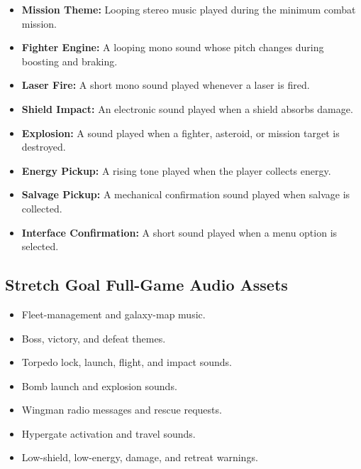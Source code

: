 \documentclass[journal]{IEEEtran}
\begin{document}
\begin{itemize}

    \item \textbf{Mission Theme:}
    Looping stereo music played during the minimum combat mission.

    \item \textbf{Fighter Engine:}
    A looping mono sound whose pitch changes during boosting and braking.

    \item \textbf{Laser Fire:}
    A short mono sound played whenever a laser is fired.

    \item \textbf{Shield Impact:}
    An electronic sound played when a shield absorbs damage.


    \item \textbf{Explosion:}
    A sound played when a fighter, asteroid, or mission target is destroyed.

    \item \textbf{Energy Pickup:}
    A rising tone played when the player collects energy.

    \item \textbf{Salvage Pickup:}
    A mechanical confirmation sound played when salvage is collected.

    \item \textbf{Interface Confirmation:}
    A short sound played when a menu option is selected.

\end{itemize}


\subsection{Stretch Goal Full-Game Audio Assets}

\begin{itemize}

    \item Fleet-management and galaxy-map music.
    \item Boss, victory, and defeat themes.
    \item Torpedo lock, launch, flight, and impact sounds.
    \item Bomb launch and explosion sounds.
    \item Wingman radio messages and rescue requests.
    \item Hypergate activation and travel sounds.
    \item Low-shield, low-energy, damage, and retreat warnings.

\end{itemize}
\end{document}
